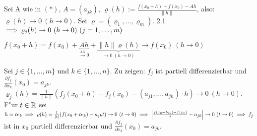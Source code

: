 \documentclass[a4paper,twoside,DIV15,BCOR12mm,chapterprefix=true,headings=twolinechapter]{scrbook}
\begin{document}
\begin{beweis}
Sei A wie in $(*)$, $A=(a_{jk})$, $\varrho(h):=\frac{f(x_0+h)-f(x_0)-Ah}{\|h\|}$, also: $\varrho(h)\to0\ (h\to 0)$. Sei $\varrho=(\varrho_1,\ldots,\varrho_m)$. 2.1 $\folgt \varrho_j(h)\to 0\ (h\to 0)\ (j=1,\ldots,m)$
\begin{liste}
\item $f(x_0+h)=f(x_0)+\underbrace{Ah}_{\overset{\text{3.5}}{\to}0}+\underbrace{\|h\|\varrho(h)}_{\to 0\ (h\to 0)}\to f(x_0)\ (h\to 0)$
\item Sei $j\in\{1,\ldots,m\}$ und $k\in\{1,\ldots,n\}$. Zu zeigen: $f_j$ ist partiell differenzierbar und $\frac{\partial f_j}{\partial x_k}(x_0)=a_{jk}$. $\varrho_j(h)=\frac{1}{\|h\|}(f_j(x_0+h)-f_j(x_0)-(a_{j1},\ldots,a_{jn})\cdot h)\to 0\ (h \to 0)$. F"ur $t\in\mathbb{R}$ sei $h=te_k\folgt\varrho(h)=\frac{1}{|t|}(f(x_0+te_k)-a_{jk}t)\to 0\ (t\to 0)\folgt\left|\frac{f(x_0+te_k)-f(x_0)}{t}-a_{jk}\right|\to 0\ (t\to 0)\folgt f_j$ ist in $x_0$ partiell differenzierbar und $\frac{\partial f_j}{\partial x_k}(x_0)=a_{jk}$.
\end{liste}
\end{beweis}
\end{document}
